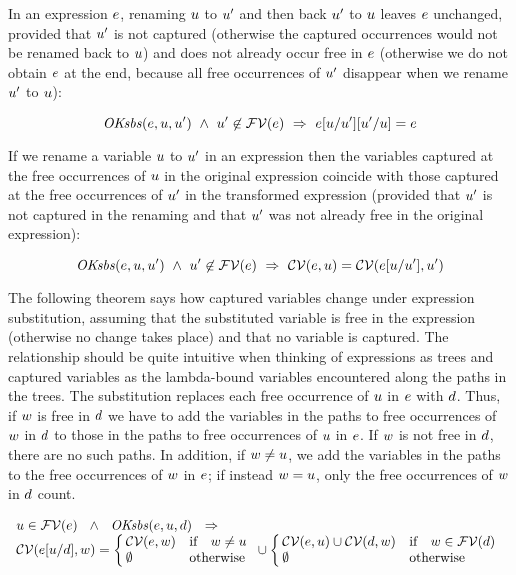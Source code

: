 In an expression $e$, renaming $u$ to $u'$ and then back $u'$
to $u$ leaves $e$ unchanged, provided that $u'$ is not captured
(otherwise the captured occurrences would not be renamed back to $u$) and
does not already occur free in $e$ (otherwise we do not obtain $e$ at
the end, because all free occurrences of $u'$ disappear when we rename
$u'$ to $u$):

\begin{theorem}\label{thm-esbs-inverse}
\[
\mathit{OKsbs}(e,u,u')\ \wedge\ 
u'\not\in\mathcal{FV}(e)\ \Rightarrow\ 
e[u/u'][u'/u]=e
\]
\end{theorem}

If we rename a variable $u$ to $u'$ in an expression then the
variables captured at the free occurrences of $u$ in the original
expression coincide with those captured at the free occurrences of $u'$ in
the transformed expression (provided that $u'$ is not captured in the
renaming and that $u'$ was not already free in the original expression):

\begin{theorem}\label{thm-capt-rename1}
\[
\mathit{OKsbs}(e,u,u')\ \wedge\ 
u'\not\in\mathcal{FV}(e)\ \Rightarrow\ 
\mathcal{CV}(e,u)=\mathcal{CV}(e[u/u'],u')
\]
\end{theorem}

The following theorem says how captured variables change under expression
substitution, assuming that the substituted variable is free in the expression
(otherwise no change takes place) and that no variable is captured. The
relationship should be quite intuitive when thinking of expressions as trees
and captured variables as the lambda-bound variables encountered along the
paths in the trees. The substitution replaces each free occurrence of $u$
in $e$ with $d$. Thus, if $w$ is free in $d$ we have to add
the variables in the paths to free occurrences of $w$ in $d$ to
those in the paths to free occurrences of $u$ in $e$. If $w$ is
not free in $d$, there are no such paths. In addition, if
$w\neq u$, we add the variables in the paths to the free occurrences
of $w$ in $e$; if instead $w=u$, only the free occurrences
of $w$ in $d$ count.

\begin{theorem}\label{thm-cvar-of-esbs}
{\rm
\[
\begin{array}{l}
u\in\mathcal{FV}(e)
\ \ \wedge\ \
\mathit{OKsbs}(e,u,d)
\ \ \Rightarrow\ \\
\mathcal{CV}(e[u/d],w)=
\left\{\!\!\begin{array}{ll} \mathcal{CV}(e,w) & \mbox{if}\quad w\neq u\\ \emptyset & \mbox{otherwise} \end{array}\right.
\cup
\left\{\!\!\begin{array}{ll} \mathcal{CV}(e,u)\cup\mathcal{CV}(d,w) & \mbox{if}\quad w\in\mathcal{FV}(d)\\ \emptyset & \mbox{otherwise} \end{array}\right.
\end{array}
\]
}
\end{theorem}

